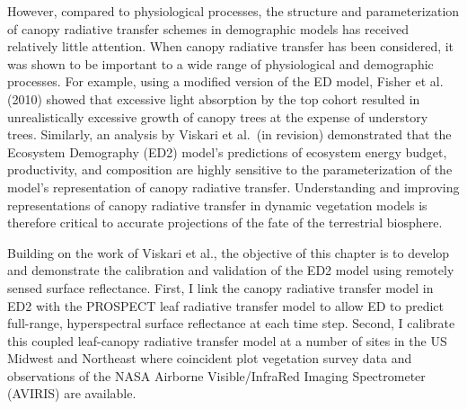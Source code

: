 However, compared to physiological processes, the structure and parameterization of canopy radiative transfer schemes in demographic models has received relatively little attention.
When canopy radiative transfer has been considered, it was shown to be important to a wide range of physiological and demographic processes.
For example, using a modified version of the ED model, Fisher et al. (2010)\nocite{fisher_2010_assessing} showed that excessive light absorption by the top cohort resulted in unrealistically excessive growth of canopy trees at the expense of understory trees.
Similarly, an analysis by Viskari et al.\ (in revision) \nocite{Viskari_inreview_ED} demonstrated that the Ecosystem Demography (ED2) model's predictions of ecosystem energy budget, productivity, and composition are highly sensitive to the parameterization of the model's representation of canopy radiative transfer.
Understanding and improving representations of canopy radiative transfer in dynamic vegetation models is therefore critical to accurate projections of the fate of the terrestrial biosphere.

Building on the work of Viskari et al., the objective of this chapter is to develop and demonstrate the calibration and validation of the ED2 model using remotely sensed surface reflectance.
First, I link the canopy radiative transfer model in ED2 with the PROSPECT leaf radiative transfer model to allow ED to predict full-range, hyperspectral surface reflectance at each time step.
Second, I calibrate this coupled leaf-canopy radiative transfer model at a number of sites in the US Midwest and Northeast where coincident plot vegetation survey data and observations of the NASA Airborne Visible/InfraRed Imaging Spectrometer (AVIRIS) are available.
